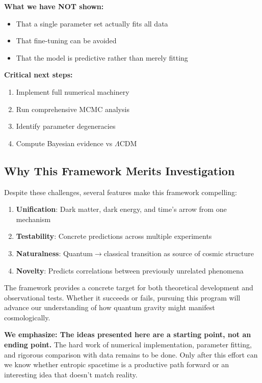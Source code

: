 \documentclass[12pt]{article}
\begin{document}
\textbf{What we have NOT shown:}
\begin{itemize}
    \item That a single parameter set actually fits all data
    \item That fine-tuning can be avoided
    \item That the model is predictive rather than merely fitting
\end{itemize}

\textbf{Critical next steps:}
\begin{enumerate}
    \item Implement full numerical machinery
    \item Run comprehensive MCMC analysis
    \item Identify parameter degeneracies
    \item Compute Bayesian evidence vs $\Lambda$CDM
\end{enumerate}

\subsection{Why This Framework Merits Investigation}

Despite these challenges, several features make this framework compelling:
\begin{enumerate}
    \item \textbf{Unification}: Dark matter, dark energy, and time's arrow from one mechanism
    \item \textbf{Testability}: Concrete predictions across multiple experiments
    \item \textbf{Naturalness}: Quantum$\to$classical transition as source of cosmic structure
    \item \textbf{Novelty}: Predicts correlations between previously unrelated phenomena
\end{enumerate}
The framework provides a concrete target for both theoretical development and observational tests. Whether it succeeds or fails, pursuing this program will advance our understanding of how quantum gravity might manifest cosmologically.

\textbf{We emphasize: The ideas presented here are a starting point, not an ending point.} The hard work of numerical implementation, parameter fitting, and rigorous comparison with data remains to be done. Only after this effort can we know whether entropic spacetime is a productive path forward or an interesting idea that doesn't match reality.
\end{document}
